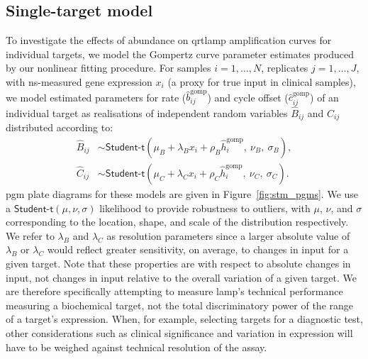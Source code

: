 \documentclass[../thesis.tex]{subfiles}
\begin{document}
\subsection{Single-target model \label{sec:singletargetmodel}}
To investigate the effects of  abundance on \gls{qrtlamp} amplification curves for individual targets, we model the Gompertz curve parameter estimates produced by our nonlinear fitting procedure. For samples $i = 1, \dots, N$, replicates $j = 1, \dots, J$, with \gls{ns}-measured gene expression $x_i$ (a proxy for true  input in clinical samples), we model estimated parameters for rate ($\hat{b}_{ij}^{\text{gomp}}$) and cycle offset ($\hat{c}_{ij}^{\text{gomp}}$) of an individual target as realisations of independent random variables $\hat{B}_{ij}$ and $\hat{C}_{ij}$ distributed according to:
\begin{align} 
    \hat{B}_{ij} & \sim \textsf{Student-t}(\mu_B + \lambda_B x_i + \rho_B \hat{h}^{\text{gomp}}_i, \ \nu_B, \ \sigma_B ), \label{eq:bsm}\\
    \hat{C}_{ij} & \sim \textsf{Student-t}(\mu_C + \lambda_C x_i + \rho_C \hat{h}^{\text{gomp}}_i, \ \nu_C, \ \sigma_C). \label{eq:csm}
\end{align}
\Gls{pgm} plate diagrams for these models are given in Figure~\ref{fig:stm_pgms}. We use a $\textsf{Student-t}(\mu,\nu,\sigma)$ likelihood to provide robustness to outliers, with $\mu$, $\nu$, and $\sigma$ corresponding to the location, shape, and scale of the distribution respectively. We refer to $\lambda_B$ and $\lambda_C$ as resolution parameters since a larger absolute value of $\lambda_B$ or $\lambda_C$ would reflect greater sensitivity, on average, to changes in  input for a given target.
Note that these properties are with respect to absolute changes in  input, not changes in  input relative to the overall variation of a given target. We are therefore specifically attempting to measure \gls{lamp}'s technical performance measuring a biochemical target, not the total discriminatory power of the range of a target's expression. When, for example, selecting targets for a diagnostic test, other considerations such as clinical significance and variation in expression will have to be weighed against technical resolution of the assay.
\end{document}
